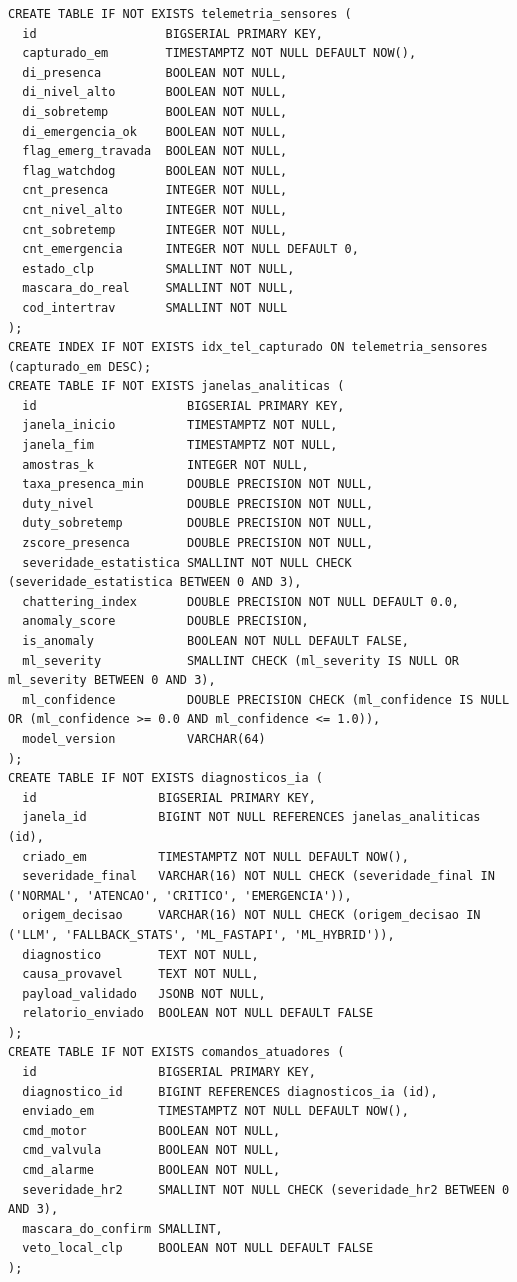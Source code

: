 \begin{quadro}[htb]
  \centering
  \SingleSpacing
  \caption{Script DDL SQL (PostgreSQL) da base de telemetria, análise híbrida e auditoria de atuação}
  \label{quadro:ddl_sql}
  \begin{lstlisting}[language=PGSQL]
CREATE TABLE IF NOT EXISTS telemetria_sensores (
  id                  BIGSERIAL PRIMARY KEY,
  capturado_em        TIMESTAMPTZ NOT NULL DEFAULT NOW(),
  di_presenca         BOOLEAN NOT NULL,
  di_nivel_alto       BOOLEAN NOT NULL,
  di_sobretemp        BOOLEAN NOT NULL,
  di_emergencia_ok    BOOLEAN NOT NULL,
  flag_emerg_travada  BOOLEAN NOT NULL,
  flag_watchdog       BOOLEAN NOT NULL,
  cnt_presenca        INTEGER NOT NULL,
  cnt_nivel_alto      INTEGER NOT NULL,
  cnt_sobretemp       INTEGER NOT NULL,
  cnt_emergencia      INTEGER NOT NULL DEFAULT 0,
  estado_clp          SMALLINT NOT NULL,
  mascara_do_real     SMALLINT NOT NULL,
  cod_intertrav       SMALLINT NOT NULL
);
CREATE INDEX IF NOT EXISTS idx_tel_capturado ON telemetria_sensores (capturado_em DESC);
CREATE TABLE IF NOT EXISTS janelas_analiticas (
  id                     BIGSERIAL PRIMARY KEY,
  janela_inicio          TIMESTAMPTZ NOT NULL,
  janela_fim             TIMESTAMPTZ NOT NULL,
  amostras_k             INTEGER NOT NULL,
  taxa_presenca_min      DOUBLE PRECISION NOT NULL,
  duty_nivel             DOUBLE PRECISION NOT NULL,
  duty_sobretemp         DOUBLE PRECISION NOT NULL,
  zscore_presenca        DOUBLE PRECISION NOT NULL,
  severidade_estatistica SMALLINT NOT NULL CHECK (severidade_estatistica BETWEEN 0 AND 3),
  chattering_index       DOUBLE PRECISION NOT NULL DEFAULT 0.0,
  anomaly_score          DOUBLE PRECISION,
  is_anomaly             BOOLEAN NOT NULL DEFAULT FALSE,
  ml_severity            SMALLINT CHECK (ml_severity IS NULL OR ml_severity BETWEEN 0 AND 3),
  ml_confidence          DOUBLE PRECISION CHECK (ml_confidence IS NULL OR (ml_confidence >= 0.0 AND ml_confidence <= 1.0)),
  model_version          VARCHAR(64)
);
CREATE TABLE IF NOT EXISTS diagnosticos_ia (
  id                 BIGSERIAL PRIMARY KEY,
  janela_id          BIGINT NOT NULL REFERENCES janelas_analiticas (id),
  criado_em          TIMESTAMPTZ NOT NULL DEFAULT NOW(),
  severidade_final   VARCHAR(16) NOT NULL CHECK (severidade_final IN ('NORMAL', 'ATENCAO', 'CRITICO', 'EMERGENCIA')),
  origem_decisao     VARCHAR(16) NOT NULL CHECK (origem_decisao IN ('LLM', 'FALLBACK_STATS', 'ML_FASTAPI', 'ML_HYBRID')),
  diagnostico        TEXT NOT NULL,
  causa_provavel     TEXT NOT NULL,
  payload_validado   JSONB NOT NULL,
  relatorio_enviado  BOOLEAN NOT NULL DEFAULT FALSE
);
CREATE TABLE IF NOT EXISTS comandos_atuadores (
  id                 BIGSERIAL PRIMARY KEY,
  diagnostico_id     BIGINT REFERENCES diagnosticos_ia (id),
  enviado_em         TIMESTAMPTZ NOT NULL DEFAULT NOW(),
  cmd_motor          BOOLEAN NOT NULL,
  cmd_valvula        BOOLEAN NOT NULL,
  cmd_alarme         BOOLEAN NOT NULL,
  severidade_hr2     SMALLINT NOT NULL CHECK (severidade_hr2 BETWEEN 0 AND 3),
  mascara_do_confirm SMALLINT,
  veto_local_clp     BOOLEAN NOT NULL DEFAULT FALSE
);
  \end{lstlisting}
\end{quadro}

